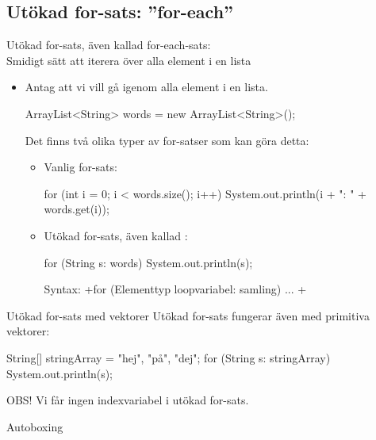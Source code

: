 \subsection{Utökad for-sats: ''for-each''}
\begin{Slide}{Utökad for-sats, även kallad for-each-sats: \\ Smidigt sätt att iterera över alla element i en lista}\footnotesize
\begin{itemize}
\item  Antag att vi vill gå igenom alla element i en lista. 
\begin{Code}[numberstyle=]
        ArrayList<String> words = new ArrayList<String>();
\end{Code}
Det finns två olika typer av for-satser som kan göra detta:
\begin{itemize}\footnotesize
\item  Vanlig for-sats:
\begin{Code}[numberstyle=]
for (int i = 0; i < words.size(); i++) {
    System.out.println(i + ": " + words.get(i));
}
\end{Code}

\item  Utökad for-sats, även kallad :
\begin{Code}[numberstyle=]
for (String s: words) {
    System.out.println(s);
}
\end{Code}
Syntax: \code+for (Elementtyp loopvariabel: samling) { ... }+
\end{itemize}
\end{itemize}
\end{Slide}

\begin{Slide}{Utökad for-sats med vektorer}
Utökad for-sats fungerar även med primitiva vektorer:
\begin{Code}[numberstyle=]
        String[] stringArray = {"hej", "på", "dej"};
        for (String s: stringArray){
            System.out.println(s);
        }
\end{Code}
OBS! Vi får ingen indexvariabel i utökad for-sats.
\end{Slide}


\begin{Slide}{Autoboxing}
\end{Slide}

